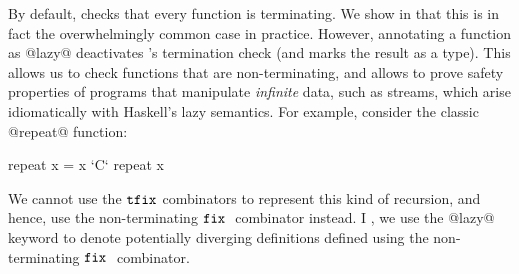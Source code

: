 By default, \toolname checks that every function is 
terminating. We show in  that 
this is in fact the overwhelmingly common case in practice.
%
However, annotating a function as @lazy@ deactivates 
\toolname's termination check (and marks the result as a 
\Div type).
%
This allows us to check functions that are 
non-terminating, and allows \toolname to prove safety 
properties of programs that manipulate \emph{infinite} 
data, such as streams, which arise idiomatically with 
Haskell's lazy semantics.
% 
For example, consider the classic @repeat@ function:
%
\begin{code}
  repeat x = x `C` repeat x
\end{code}
%
We cannot use the $\mathtt{tfix}_{}$ combinators to 
represent this kind of recursion, and hence, 
use the non-terminating $\mathtt{fix}\ {}$ combinator 
instead. 
%
I \toolname, we use the @lazy@ keyword to denote 
potentially diverging definitions 
defined using the non-terminating $\mathtt{fix}\ {}$ combinator.



